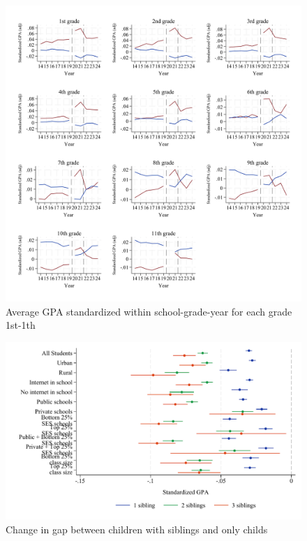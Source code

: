 \begin{figure}[htbp]
         \centering
        \includegraphics[width=\textwidth]{./FIGURES/Descriptive/raw_grades_std_gpa_m_adj_siblings.pdf}
        \caption{Average GPA standardized within school-grade-year for each grade 1st-1th}
        \label{fig:trend_gpa_grades}
\end{figure}



\begin{figure}[htbp]
    \centering
    
        \includegraphics[width=\textwidth]{./FIGURES/TWFE/covid_twfe_A_bysibs_elm_all_gpa_m_adj_Tsiblings_Soldest_4.pdf}
        \caption{Change in gap between children with siblings and only childs}
        \label{fig:fig_appA}

\end{figure}

